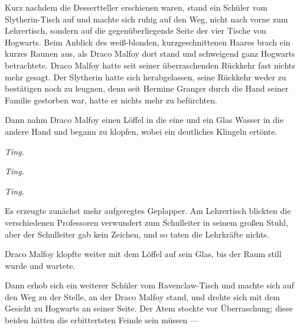 Kurz nachdem die Dessertteller erschienen waren, stand ein Schüler vom Slytherin-Tisch auf und machte sich ruhig auf den Weg, nicht nach vorne zum Lehrertisch, sondern auf die gegenüberliegende Seite der vier Tische von Hogwarts. Beim Anblick des weiß-blonden, kurzgeschnittenen Haares brach ein kurzes Raunen aus, als Draco Malfoy dort stand und schweigend ganz Hogwarts betrachtete. Draco Malfoy hatte seit seiner überraschenden Rückkehr fast nichts mehr gesagt. Der Slytherin hatte sich herabgelassen, seine Rückkehr weder zu bestätigen noch zu leugnen, denn seit Hermine Granger durch die Hand seiner Familie gestorben war, hatte er nichts mehr zu befürchten.

Dann nahm Draco Malfoy einen Löffel in die eine und ein Glas Wasser in die andere Hand und begann zu klopfen, wobei ein deutliches Klingeln ertönte.

\emph{Ting.}

\emph{Ting.}

\emph{Ting.}

Es erzeugte zunächst mehr aufgeregtes Geplapper. Am Lehrertisch blickten die verschiedenen Professoren verwundert zum Schulleiter in seinem großen Stuhl, aber der Schulleiter gab kein Zeichen, und so taten die Lehrkräfte nichts.

Draco Malfoy klopfte weiter mit dem Löffel auf sein Glas, bis der Raum still wurde und wartete.

Dann erhob sich ein weiterer Schüler vom Ravenclaw-Tisch und machte sich auf den Weg zu der Stelle, an der Draco Malfoy stand, und drehte sich mit dem Gesicht zu Hogwarts an seiner Seite. Der Atem stockte vor Überraschung; diese beiden hätten die erbittertsten Feinde sein müssen —

